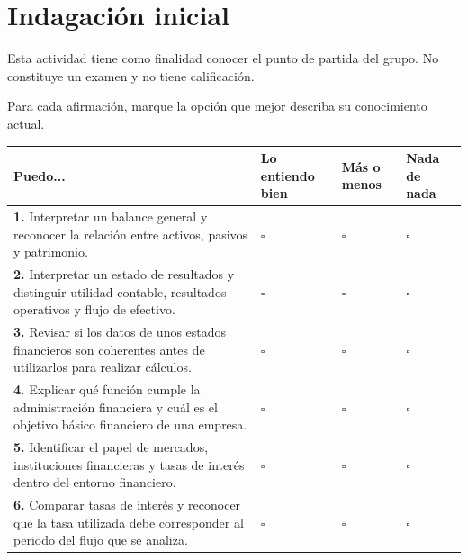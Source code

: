 \documentclass[10pt]{article}
\begin{document}
\section{Indagación inicial}

Esta actividad tiene como finalidad conocer el punto de partida del grupo.
No constituye un examen y no tiene calificación.

\vspace{0.2cm}

\noindent
Para cada afirmación, marque la opción que mejor describa su conocimiento actual.

\vspace{0.3cm}

\begin{table}[H]
\centering
\footnotesize
\renewcommand{\arraystretch}{1.35}

\begin{tabularx}{\textwidth}{
    >{\raggedright\arraybackslash}X
    >{\centering\arraybackslash}p{1.8cm}
    >{\centering\arraybackslash}p{1.8cm}
    >{\centering\arraybackslash}p{1.8cm}
}
\toprule
\textbf{Puedo...} &
\textbf{Lo entiendo bien} &
\textbf{Más o menos} &
\textbf{Nada de nada} \\
\midrule

\textbf{{1.}} Interpretar un balance general y reconocer la relación entre activos, pasivos y patrimonio.
& $\square$ & $\square$ & $\square$ \\

\textbf{{2.}} Interpretar un estado de resultados y distinguir utilidad contable, resultados operativos y flujo de efectivo.
& $\square$ & $\square$ & $\square$ \\

\textbf{{3.}} Revisar si los datos de unos estados financieros son coherentes antes de utilizarlos para realizar cálculos.
& $\square$ & $\square$ & $\square$ \\

\textbf{{4.}} Explicar qué función cumple la administración financiera y cuál es el objetivo básico financiero de una empresa.
& $\square$ & $\square$ & $\square$ \\

\textbf{{5.}} Identificar el papel de mercados, instituciones financieras y tasas de interés dentro del entorno financiero.
& $\square$ & $\square$ & $\square$ \\

\textbf{{6.}} Comparar tasas de interés y reconocer que la tasa utilizada debe corresponder al periodo del flujo que se analiza.
& $\square$ & $\square$ & $\square$ \\


\end{tabularx}
\end{table}
\end{document}
